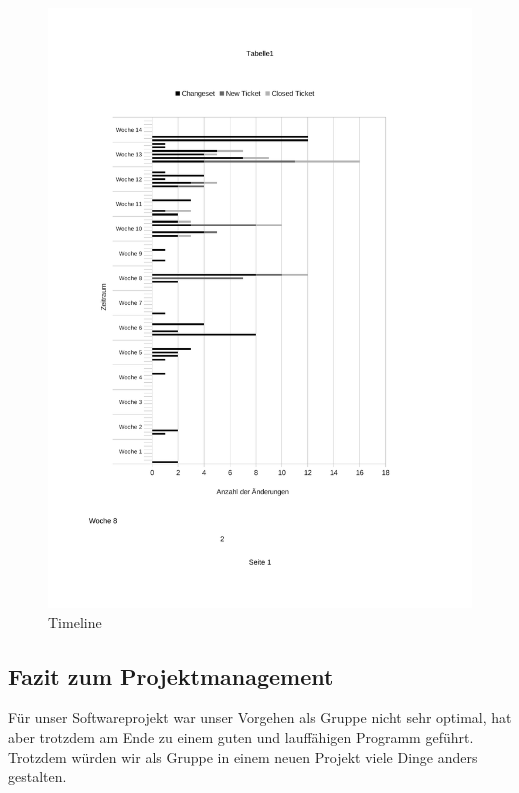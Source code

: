 \begin{figure}[htbp]
\centering
\includegraphics{03_pics/stat2.pdf}
\caption{Timeline}
\label{fig:activeTime}
\end{figure}


\subsection{Fazit zum Projektmanagement}
\label{subsec:fazitPM}

Für unser Softwareprojekt war unser Vorgehen als Gruppe nicht sehr optimal, hat aber trotzdem am Ende zu einem guten und lauffähigen Programm geführt. Trotzdem würden wir als Gruppe in einem neuen Projekt viele Dinge anders gestalten.

